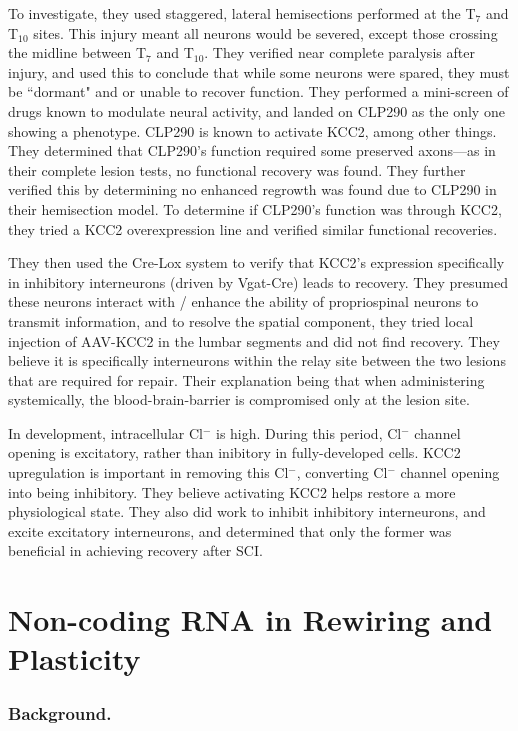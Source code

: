 To investigate, they used staggered, lateral hemisections performed at the T$_7$ and T$_{10}$ sites. This injury meant all neurons would be severed, except those crossing the midline between T$_7$ and T$_{10}$. They verified near complete paralysis after injury, and used this to conclude that while some neurons were spared, they must be ``dormant" and or unable to recover function. They performed a mini-screen of drugs known to modulate neural activity, and landed on CLP290 as the only one showing a phenotype. CLP290 is known to activate KCC2, among other things. They determined that CLP290's function required some preserved axons---as in their complete lesion tests, no functional recovery was found. They further verified this by determining no enhanced regrowth was found due to CLP290 in their hemisection model. To determine if CLP290's function was through KCC2, they tried a KCC2 overexpression line and verified similar functional recoveries.\newline

They then used the Cre-Lox system to verify that KCC2's expression specifically in inhibitory interneurons (driven by Vgat-Cre) leads to recovery. They presumed these neurons interact with / enhance the ability of propriospinal neurons to transmit information, and to resolve the spatial component, they tried local injection of AAV-KCC2 in the lumbar segments and did not find recovery. They believe it is specifically interneurons within the relay site between the two lesions that are required for repair. Their explanation being that when administering systemically, the blood-brain-barrier is compromised only at the lesion site.\newline

In development, intracellular Cl$^-$ is high. During this period, Cl$^-$ channel opening is excitatory, rather than inibitory in fully-developed cells. KCC2 upregulation is important in removing this Cl$^-$, converting Cl$^-$ channel opening into being inhibitory. They believe activating KCC2 helps restore a more physiological state. They also did work to inhibit inhibitory interneurons, and excite excitatory interneurons, and determined that only the former was beneficial in achieving recovery after SCI. 


\section{Non-coding RNA in Rewiring and Plasticity}

\subsubsection{Background.}

